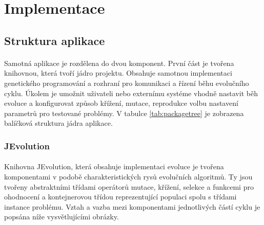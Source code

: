 \documentclass[bc,male,java,dept460]{diploma}		%
\begin{document}
\section{Implementace}
\subsection{Struktura aplikace}
\paragraph*{}
Samotná aplikace je rozdělena do dvou komponent. První část je tvořena knihovnou, která tvoří jádro projektu. Obsahuje samotnou implementaci genetického programování a rozhraní pro komunikaci a řízení běhu evolučního cyklu. Úkolem je umožnit uživateli nebo externímu systéme vhodně nastavit běh evoluce a konfigurovat způsob křížení, mutace, reprodukce volbu nastavení parametrů pro testované problémy. V tabulce \ref{tab:packagetree} je zobrazena balíčková struktura jádra aplikace.

\subsubsection{JEvolution}
\paragraph*{}
Knihovna JEvolution, která obsahuje implementaci evoluce je tvořena komponentami v podobě charakteristických rysů evolučních algoritmů. Ty jsou tvořeny abstraktními třídami operátorů mutace, křížení, selekce a funkcemi pro ohodnocení a kontejnerovou třídou reprezentující populaci spolu s třídami instance problému. Vztah a vazba mezi komponentami jednotlivých částí cyklu je popsána níže vysvětlujícími obrázky.
\end{document}
